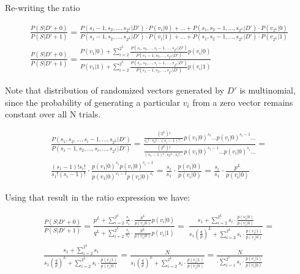 \documentclass[11pt,draft]{article}
\begin{document}
Re-writing the ratio

\begin{align}
\frac{P(S|D'+0)}{P(S|D'+1)} = \frac{P(s_1-1,s_2,\dots,s_{2^L}|D') \cdot P(v_1|0) + \dots + P(s_1,s_2-1,\dots,s_{2^L}|D') \cdot P(v_{2^L}|0) }{P(s_1-1,s_2,\dots,s_{2^L}|D') \cdot P(v_1|1) + \dots + P(s_1,s_2-1,\dots,s_{2^L}|D') \cdot P(v_{2^L}|1)}\\
\frac{P(S|D'+0)}{P(S|D'+1)} = \frac{ P(v_1|0)  + \sum_{i=2}^{2^L} \frac{P(s_1,s_2,\dots,s_i-1,\dots,s_{2^L}|D')}{P(s_1-1,s_2,\dots,s_{2^L}|D')} p(v_i|0)} {P(v_1|1)  + \sum_{i=2}^{2^L} \frac{P(s_1,s_2,\dots,s_i-1,\dots,s_{2^L}|D')}{P(s_1-1,s_2,\dots,s_{2^L}|D')} p(v_i|1)}
\end{align}

Note that distribution of randomized vectors generated by $D'$ is multinomial, since the probability of generating a particular $v_i$ from a zero vector remains constant over all N trials.

\begin{align}
 \frac{P(s_1,s_2,\dots,s_i-1,\dots,s_{2^L}|D')}{P(s_1-1,s_2,\dots,s_i,\dots,s_{2^L}|D')}  = \frac{ \frac{(2^L)!}{s_1!\cdot s_2! \dots (s_i-1)!\dots} p(v_1|0)^{s_1} \dots p(v_i|0)^{s_i-1} \dots  }{ \frac{(2^L)!}{(s_1-1)!\cdot s_2! \dots s_i!\dots} p(v_1|0)^{s_1-1} \dots p(v_i|0)^{s_i} \dots} = \\
\frac{(s_1-1)!s_i!}{s_1!(s_i-1)!} \cdot \frac{p(v_1|0)^{s_1} p(v_i|0)^{s_i-1} }{  p(v_1|0)^{s_1-1} p(v_i|0)^{s_i} } = \frac{s_i}{s_1} \cdot \frac{p(v_1|0)}{p(v_i|0)} =  \frac{s_i}{s_1}  \cdot \frac{p^L}{p(v_i|0)}
 \end{align}
 
 
Using that result in the ratio expression we have:

\begin{align}
\frac{P(S|D'+0)}{P(S|D'+1)} = \frac{ p^L  + \sum_{i=2}^{2^L} \frac{s_i}{s_1}  \cdot \frac{p^L}{p(v_i|0)}  p(v_i|0) } {q^L  + \sum_{i=2}^{2^L} \frac{s_i}{s_1}  \cdot \frac{p^L}{p(v_i|0)} p(v_i|1)} = \
\frac{ s_1  + \sum_{i=2}^{2^L} s_i  \cdot \frac{p(v_i|0)}{p(v_i|0)}   } {s_1 \left ( \frac{q}{p} \right )^L +   \sum_{i=2}^{2^L}  s_i \cdot  \frac{p(v_i|1)}{p(v_i|0)}   } = \\
\frac {s_1 +   \sum_{i=2}^{2^L}  s_i} { s_1 \left ( \frac{q}{p} \right )^L  + \sum_{i=2}^{2^L} s_i  \cdot \frac{p(v_i|1)}{p(v_i|0)}   }   = \frac {N} { s_1 \left ( \frac{q}{p} \right )^L  + \sum_{i=2}^{2^L} s_i  \cdot \frac{p(v_i|1)}{p(v_i|0)}   }= \frac{N}{ \cdot  \sum_{i=1}^{2^L} s_i  \cdot \frac{p(v_i|1)}{p(v_i|0)} }
\end{align}
\end{document}
